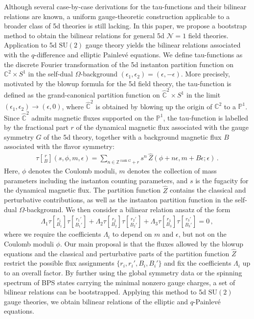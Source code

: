 \documentclass[11pt, a4paper]{article}
\DeclareMathOperator{\rank}{rank}
\newcommand{\tauftn}[2]{\tau\genfrac[]{0pt}{1}{#1}{#2}}
\theoremstyle{definition}
\begin{document}
Although several case-by-case derivations for the tau-functions and their bilinear relations are known, a uniform gauge-theoretic construction applicable to a broader class of 5d theories is still lacking. In this paper, we propose a bootstrap method to obtain the bilinear relations for general 5d $ \mathcal{N}=1 $ field theories. Application to 5d $ \mathrm{SU}(2) $ gauge theory yields the bilinear relations associated with the $ q $-difference and elliptic Painlev\'e equations. We define tau-functions as the discrete Fourier transformation of the 5d instanton partition function on $ \mathbb{C}^2 \times S^1 $ in the self-dual $ \Omega $-background $ (\epsilon_1,\epsilon_2)=(\epsilon,-\epsilon) $. More precisely, motivated by the blowup formula \cite{Huang:2017mis, Kim:2020hhh} for the 5d field theory, the tau-function is defined as the grand-canonical partition function on $ \hat{\mathbb{C}}^2 \times S^1 $ in the limit $ (\epsilon_1,\epsilon_2) \to (\epsilon,0) $, where $ \hat{\mathbb{C}}^2 $ is obtained by blowing up the origin of $ \mathbb{C}^2 $ to a $ \mathbb{P}^1 $. Since $ \hat{\mathbb{C}}^2 $ admits magnetic fluxes supported on the $ \mathbb{P}^1 $, the tau-function is labelled by the fractional part $ r $ of the dynamical magnetic flux associated with the gauge symmetry $ G $ of the 5d theory, together with a background magnetic flux $ B $ associated with the flavor symmetry:
\begin{align}
    \tauftn{r}{B}(s,\phi,m,\epsilon) = \sum_{n\in\mathbb Z^{\rank G}+r}s^n\, \hat Z(\phi+n\epsilon,m+B\epsilon;\epsilon)\, .
\end{align}
Here, $ \phi $ denotes the Coulomb moduli, $ m $ denotes the collection of mass parameters including the instanton counting parameters, and $ s $ is the fugacity for the dynamical magnetic flux. The partition function $ \hat{Z} $ contains the classical and perturbative contributions, as well as the instanton partition function in the self-dual $ \Omega $-background. We then consider a bilinear relation ansatz of the form 
\begin{align}
    \Lambda_1\tauftn{r_1}{B_1}\tauftn{r_1'}{B_1'}+\Lambda_2\tauftn{r_2}{B_2}\tauftn{r_2'}{B_2'}+\Lambda_3\tauftn{r_3}{B_3}\tauftn{r_3'}{B_3'}=0\, ,
\end{align} 
where we require the coefficients $\Lambda_i$ to depend on $m$ and $\epsilon$, but not on the Coulomb moduli $\phi$. Our main proposal is that the fluxes allowed by the blowup equations \cite{Huang:2017mis,Kim:2019uqw, Gu:2019pqj,Kim:2020hhh} and the classical and perturbative parts of the partition function $ \hat{Z} $ restrict the possible flux assignments $\{r_i,r_i',B_i,B_i'\}$ and fix the coefficients $\Lambda_i$ up to an overall factor. By further using the global symmetry data or the spinning spectrum of BPS states carrying the minimal nonzero gauge charges, a set of bilinear relations can be bootstrapped. Applying this method to 5d $ \mathrm{SU}(2) $ gauge theories, we obtain bilinear relations of the elliptic and $ q $-Painlev\'e equations.
\end{document}
